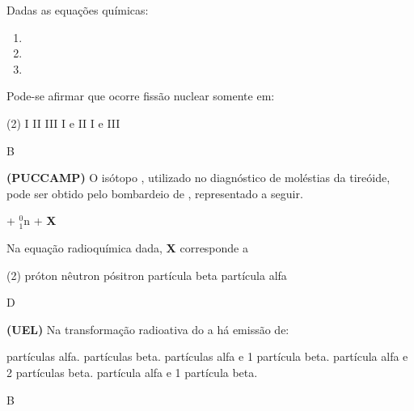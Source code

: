\documentclass[9 pt]{scrartcl}
\def\PQ{0.84} %
\begin{document}
\begin{exercise}[points=\PQ]
Dadas as equações químicas:

\begin{enumerate}[label=\Roman*]
\item {}
\item {}
\item {}
\end{enumerate}

Pode-se afirmar que ocorre fissão nuclear somente em:

\begin{choice}(2)
\choice I
\choice II
\choice III
\choice I e II
\choice I e III
\end{choice}
\end{exercise}
\begin{solution}
B
\end{solution}


\begin{exercise}[points=\PQ]
\textbf{(PUCCAMP)} O isótopo , utilizado no diagnóstico de
moléstias da tireóide, pode ser obtido pelo bombardeio de , representado a seguir.

\begin{center}
 + $_{1}^{0}${n} \ch{->}  + {\bfseries X}
\end{center}


Na equação radioquímica dada,  \textbf{X} corresponde a

\begin{choice}(2)
\choice próton
\choice nêutron
\choice pósitron
\choice partícula beta
\choice partícula alfa
\end{choice}
\end{exercise}
\begin{solution}
D
\end{solution}


\begin{exercise}[points=\PQ]
\textbf{(UEL)} Na transformação radioativa do  a  há emissão de:
\begin{choice}
 partículas alfa.
 partículas beta.
 partículas alfa e 1 partícula beta.
 partícula alfa e 2 partículas beta.
 partícula alfa e 1 partícula beta.
\end{choice}
\end{exercise}
\begin{solution}
B
\end{solution}
\end{document}
